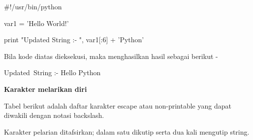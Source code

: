 \documentclass[a4paper,12pt]{report}
\begin{document}
\noindent 
 $  \#  $!/usr/bin/python \par
\vspace{12pt}
\noindent 
var1 = 'Hello World!' \par
\vspace{12pt}
\noindent 
print "Updated String :- ", var1[:6] + 'Python' \par
\vspace{12pt}
\noindent 
Bila kode diatas dieksekusi, maka menghasilkan hasil sebagai berikut - \par
\vspace{12pt}
\noindent 
Updated~String :-  Hello Python \par
\noindent 
\vspace{12pt}
\noindent 
\textbf{Karakter melarikan diri} \par
\noindent 
\vspace{12pt}
\noindent 
Tabel berikut adalah daftar karakter escape atau non-printable yang dapat diwakili dengan notasi backslash. \par
\noindent 
\vspace{12pt}
\noindent 
Karakter pelarian ditafsirkan; dalam satu dikutip serta dua kali mengutip string. \par
\vspace{12pt}


\end{document}
